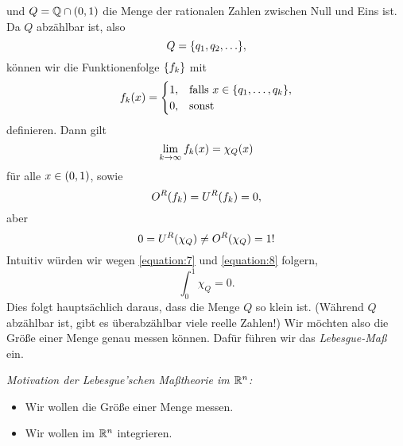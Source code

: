 und \(Q = \Q \cap \parentheses*{0, 1}\) die Menge der rationalen Zahlen zwischen Null und Eins ist.
Da \(Q\) abzählbar ist, also
\[
	Q = \braces*{q_1, q_2, \ldots},
\]
können wir die Funktionenfolge \(\braces*{f_k}\) mit
\[
	f_k\parentheses*{x} = \begin{cases}
		1, & \text{falls }x \in \braces*{q_1, \ldots, q_k},\\
		0, & \text{sonst}
	\end{cases}
\]
definieren.
Dann gilt
\begin{equation}\label{equation:7}
	\lim_{k \to \infty}f_k\parentheses*{x} = \chi_Q\parentheses*{x}
\end{equation}
für alle \(x \in \parentheses*{0, 1}\), sowie
\begin{equation}\label{equation:8}
	O^R\parentheses*{f_k} = U^R\parentheses*{f_k} = 0,
\end{equation}
aber
\[
	0 = U^R\parentheses*{\chi_Q} \ne O^R\parentheses*{\chi_Q} = 1\text{!}
\]
Intuitiv würden wir wegen \eqref{equation:7} und \eqref{equation:8} folgern,
\[
	\int_0^1 \chi_Q = 0.
\]
Dies folgt hauptsächlich daraus, dass die Menge \(Q\) so klein ist.
(Während \(Q\) abzählbar ist, gibt es überabzählbar viele reelle Zahlen!)
Wir möchten also die Größe einer Menge genau messen können.
Dafür führen wir das \emph{Lebesgue-Maß} ein.

\emph{Motivation der Lebesgue'schen Maßtheorie im \(\R^n\):}
\begin{itemize}
	\item Wir wollen die Größe einer Menge messen.
	\item Wir wollen im \(\R^n\) integrieren.
\end{itemize}

